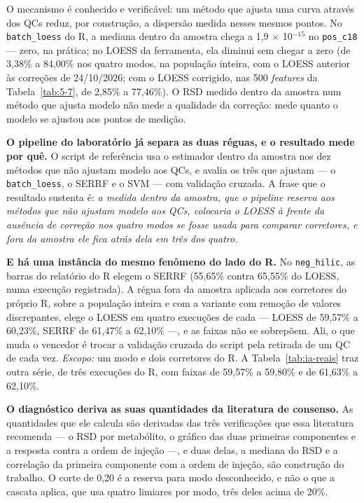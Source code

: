 O mecanismo é conhecido e verificável: um método que ajusta uma curva através dos QCs reduz, por construção, a dispersão medida nesses mesmos pontos. No \texttt{batch\_\allowbreak{}loess} do R, a mediana dentro da amostra chega a 1,9 $\times$ 10$^{-15}$ no \texttt{pos\_\allowbreak{}c18} --- zero, na prática; no LOESS da ferramenta, ela diminui sem chegar a zero (de 3,38\% a 84,00\% nos quatro modos, na população inteira, com o LOESS anterior às correções de 24/10/2026; com o LOESS corrigido, nas 500 \textit{features} da Tabela~\ref{tab:5-7}, de 2,85\% a 77,46\%). O RSD medido dentro da amostra num método que ajusta modelo não mede a qualidade da correção: mede quanto o modelo se ajustou aos pontos de medição.

\textbf{O pipeline do laboratório já separa as duas réguas, e o resultado mede por quê.} O script de referência usa o estimador dentro da amostra nos dez métodos que não ajustam modelo aos QCs, e avalia os três que ajustam --- o \texttt{batch\_\allowbreak{}loess}, o SERRF e o SVM --- com validação cruzada. A frase que o resultado sustenta é: \textit{a medida dentro da amostra, que o pipeline reserva aos métodos que não ajustam modelo aos QCs, colocaria o LOESS à frente da ausência de correção nos quatro modos se fosse usada para comparar corretores, e fora da amostra ele fica atrás dela em três dos quatro.}

\textbf{E há uma instância do mesmo fenômeno do lado do R.} No \texttt{neg\_\allowbreak{}hilic}, as barras do relatório do R elegem o SERRF (55,65\% contra 65,55\% do LOESS, numa execução registrada). A régua fora da amostra aplicada aos corretores do próprio R, sobre a população inteira e com a variante com remoção de valores discrepantes, elege o LOESS em quatro execuções de cada --- LOESS de 59,57\% a 60,23\%, SERRF de 61,47\% a 62,10\% ---, e as faixas não se sobrepõem. Ali, o que muda o vencedor é trocar a validação cruzada do script pela retirada de um QC de cada vez. \textit{Escopo:} um modo e dois corretores do R. A Tabela~\ref{tab:ia-reais} traz outra série, de três execuções do R, com faixas de 59,57\% a 59,80\% e de 61,63\% a 62,10\%.

\textbf{O diagnóstico deriva as suas quantidades da literatura de consenso.} As quantidades que ele calcula são derivadas das três verificações que essa literatura recomenda --- o RSD por metabólito, o gráfico das duas primeiras componentes e a resposta contra a ordem de injeção ---, e duas delas, a mediana do RSD e a correlação da primeira componente com a ordem de injeção, são construção do trabalho. O corte de 0,20 é a reserva para modo desconhecido, e não o que a cascata aplica, que usa quatro limiares por modo, três deles acima de 20\%.

